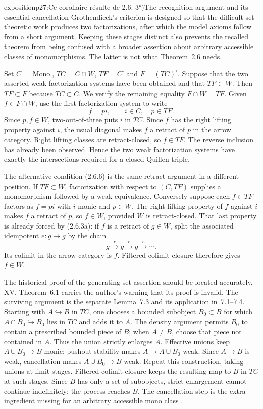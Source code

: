 \begin{dcomment}{exposition}{p27:Ce corollaire résulte de 2.6. 3°)}{The recognition argument and its essential cancellation}
Grothendieck's criterion is designed so that the difficult set-theoretic work produces two factorizations, after which the model axioms follow from a short argument. Keeping these stages distinct also prevents the recalled theorem from being confused with a broader assertion about arbitrary accessible classes of monomorphisms. The latter is not what Theorem~2.6 needs.

Set $C=\operatorname{Mono}$, $TC=C\cap W$, $TF=C^{\square}$ and $F=(TC)^{\square}$. Suppose that the two asserted weak factorization systems have been obtained and that $TF\subset W$. Then $TF\subset F$ because $TC\subset C$. We verify the remaining equality $F\cap W=TF$. Given $f\in F\cap W$, use the first factorization system to write
\[
 f=pi,\qquad i\in C,\quad p\in TF.
\]
Since $p,f\in W$, two-out-of-three puts $i$ in $TC$. Since $f$ has the right lifting property against $i$, the usual diagonal makes $f$ a retract of $p$ in the arrow category. Right lifting classes are retract-closed, so $f\in TF$. The reverse inclusion has already been observed. Hence the two weak factorization systems have exactly the intersections required for a closed Quillen triple.

The alternative condition (2.6.6) is the same retract argument in a different position. If $TF\subset W$, factorization with respect to $(C,TF)$ supplies a monomorphism followed by a weak equivalence. Conversely suppose each $f\in TF$ factors as $f=pi$ with $i$ monic and $p\in W$. The right lifting property of $f$ against $i$ makes $f$ a retract of $p$, so $f\in W$, provided $W$ is retract-closed. That last property is already forced by (2.6.3a): if $f$ is a retract of $g\in W$, split the associated idempotent $e:g\to g$ by the chain
\[
 g\xrightarrow e g\xrightarrow e g\xrightarrow e\cdots .
\]
Its colimit in the arrow category is $f$. Filtered-colimit closure therefore gives $f\in W$.

The historical proof of the generating-set assertion should be located accurately. XV, Theorem~6.1 carries the author's warning that its proof is invalid. The surviving argument is the separate Lemma~7.3 and its application in~7.1--7.4. Starting with $A\hookrightarrow B$ in $TC$, one chooses a bounded subobject $B_0\subset B$ for which $A\cap B_0\hookrightarrow B_0$ lies in $TC$ and adds it to $A$. The density argument permits $B_0$ to contain a prescribed bounded piece of $B$; when $A\ne B$, choose that piece not contained in $A$. Thus the union strictly enlarges $A$. Effective unions keep $A\cup B_0\to B$ monic; pushout stability makes $A\to A\cup B_0$ weak. Since $A\to B$ is weak, cancellation makes $A\cup B_0\to B$ weak. Repeat this construction, taking unions at limit stages. Filtered-colimit closure keeps the resulting map to $B$ in $TC$ at such stages. Since $B$ has only a set of subobjects, strict enlargement cannot continue indefinitely: the process reaches $B$. The cancellation step is the extra ingredient missing for an arbitrary accessible mono class \citep[§7, especially Lemma~7.3 and Corollary~7.4]{Grothendieck1990XV}.


\end{dcomment}
